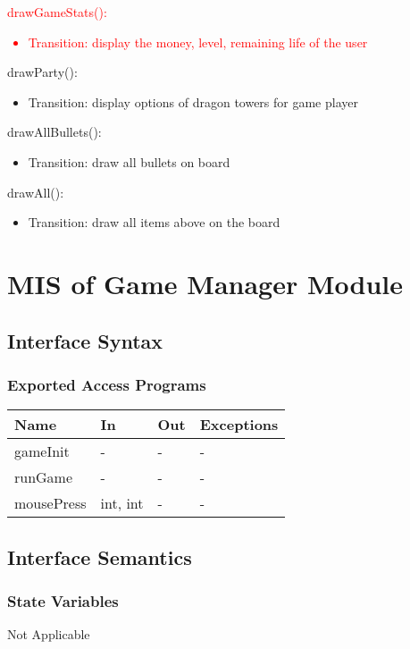 \documentclass[12,english]{article}
\begin{document}
\noindent \textcolor{red}{drawGameStats():}
\textcolor{red}{\begin{itemize}
    \item Transition: display the money, level, remaining life of the user
\end{itemize}}


\noindent drawParty():
\begin{itemize}
    \item Transition: display options of dragon towers for game player 
\end{itemize}

\noindent drawAllBullets():
\begin{itemize}
    \item Transition: draw all bullets on board
\end{itemize}

\noindent drawAll():
\begin{itemize}
    \item Transition: draw all items above on the board
\end{itemize}


\section{MIS of Game Manager Module}
\subsection{Interface Syntax}
\subsubsection{Exported Access Programs}
\begin{table}[h!]
    \centering
    \begin{tabular}{|p{4cm}|p{2cm}|p{2cm}|p{2cm}|}
    \hline
    \textbf {Name}  & {In} & {Out} & {Exceptions} \\
    \hline
    gameInit & - & - & -\\
    \hline 
    runGame & - & - & -\\
    \hline 
    mousePress & int, int & - & -\\
    \hline 
    \end{tabular}
\end{table}
\subsection{Interface Semantics}
\subsubsection{State Variables}
Not Applicable 
\end{document}
